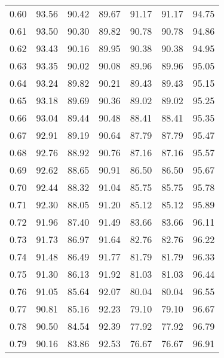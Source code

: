 \begin{tabular}{|c|c|c|c|c|c|c|}
      0.60 &     93.56 &     90.42 &      89.67 &   91.17 &      91.17 &         94.75 \\
      0.61 &     93.50 &     90.30 &      89.82 &   90.78 &      90.78 &         94.86 \\
      0.62 &     93.43 &     90.16 &      89.95 &   90.38 &      90.38 &         94.95 \\
      0.63 &     93.35 &     90.02 &      90.08 &   89.96 &      89.96 &         95.05 \\
      0.64 &     93.24 &     89.82 &      90.21 &   89.43 &      89.43 &         95.15 \\
      0.65 &     93.18 &     89.69 &      90.36 &   89.02 &      89.02 &         95.25 \\
      0.66 &     93.04 &     89.44 &      90.48 &   88.41 &      88.41 &         95.35 \\
      0.67 &     92.91 &     89.19 &      90.64 &   87.79 &      87.79 &         95.47 \\
      0.68 &     92.76 &     88.92 &      90.76 &   87.16 &      87.16 &         95.57 \\
      0.69 &     92.62 &     88.65 &      90.91 &   86.50 &      86.50 &         95.67 \\
      0.70 &     92.44 &     88.32 &      91.04 &   85.75 &      85.75 &         95.78 \\
      0.71 &     92.30 &     88.05 &      91.20 &   85.12 &      85.12 &         95.89 \\
      0.72 &     91.96 &     87.40 &      91.49 &   83.66 &      83.66 &         96.11 \\
      0.73 &     91.73 &     86.97 &      91.64 &   82.76 &      82.76 &         96.22 \\
      0.74 &     91.48 &     86.49 &      91.77 &   81.79 &      81.79 &         96.33 \\
      0.75 &     91.30 &     86.13 &      91.92 &   81.03 &      81.03 &         96.44 \\
      0.76 &     91.05 &     85.64 &      92.07 &   80.04 &      80.04 &         96.55 \\
      0.77 &     90.81 &     85.16 &      92.23 &   79.10 &      79.10 &         96.67 \\
      0.78 &     90.50 &     84.54 &      92.39 &   77.92 &      77.92 &         96.79 \\
      0.79 &     90.16 &     83.86 &      92.53 &   76.67 &      76.67 &         96.91 \\

\end{tabular}
